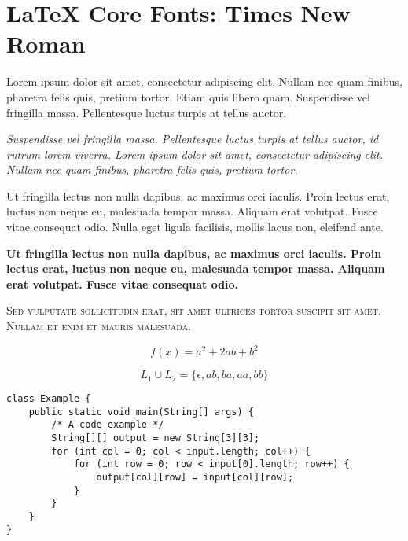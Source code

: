 \documentclass{article}
\begin{document}
\section*{LaTeX Core Fonts: Times New Roman}

\noindent\textrm{Lorem ipsum dolor sit amet, consectetur adipiscing elit. Nullam
nec quam finibus, pharetra felis quis, pretium tortor. Etiam quis libero quam.
Suspendisse vel fringilla massa. Pellentesque luctus turpis at tellus auctor.}

\bigskip\noindent\textit{Suspendisse vel fringilla massa. Pellentesque luctus
turpis at tellus auctor, id rutrum lorem viverra. Lorem ipsum dolor sit amet,
consectetur adipiscing elit. Nullam nec quam finibus, pharetra felis quis,
pretium tortor.}

\bigskip\noindent\textmd{Ut fringilla lectus non nulla dapibus, ac maximus orci
iaculis. Proin lectus erat, luctus non neque eu, malesuada tempor massa. Aliquam
erat volutpat. Fusce vitae consequat odio. Nulla eget ligula facilisis, mollis
lacus non, eleifend ante.}

\bigskip\noindent\textbf{Ut fringilla lectus non nulla dapibus, ac maximus orci
iaculis. Proin lectus erat, luctus non neque eu, malesuada tempor massa. Aliquam
erat volutpat. Fusce vitae consequat odio.}

\bigskip\noindent\textsc{Sed vulputate sollicitudin erat, sit amet ultrices
tortor suscipit sit amet. Nullam et enim et mauris malesuada.} 

\bigskip

\begin{equation}
    f(x) = a^2 + 2ab + b^2
\end{equation}

\begin{equation}
    L_1 \cup L_2 = \{\epsilon, ab, ba, aa, bb\}
\end{equation}

\bigskip

\begin{verbatim}
class Example {
    public static void main(String[] args) {
        /* A code example */
        String[][] output = new String[3][3];
        for (int col = 0; col < input.length; col++) {
            for (int row = 0; row < input[0].length; row++) {
                output[col][row] = input[col][row];
            }
        }
    }
}
\end{verbatim}
\end{document}
